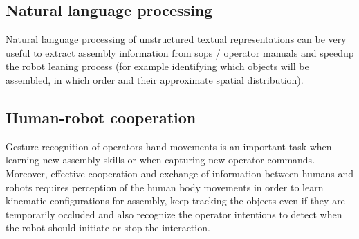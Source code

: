 \subsection{Natural language processing}

Natural language processing of unstructured textual representations can be very useful to extract assembly information from \glspl{sop} / operator manuals \cite{Stenmark2014,Stenmark2013} and speedup the robot leaning process \cite{Tenorth2010} (for example identifying which objects will be assembled, in which order and their approximate spatial distribution).



\subsection{Human-robot cooperation}

Gesture recognition of operators hand movements \cite{Oikonomidis2012,Gleeson2013} is an important task when learning new assembly skills or when capturing new operator commands. Moreover, effective cooperation \cite{Adorno2011} and exchange of information between humans and robots \cite{Putz2014,Pandey2012} requires perception of the human body movements \cite{Roitberg2014} in order to learn kinematic configurations for assembly, keep tracking the objects even if they are temporarily occluded and also recognize the operator intentions to detect when the robot should initiate or stop the interaction.


